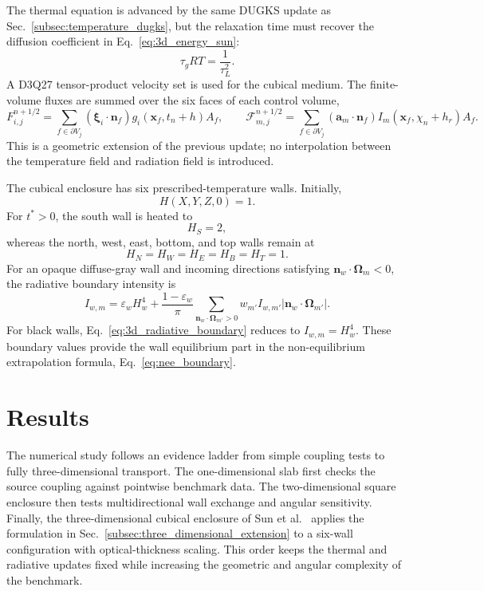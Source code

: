 \documentclass[a4paper,12pt]{ctexart}
\numberwithin{equation}{section}
\newcommand{\vb}[1]{\bm{#1}}
\newcommand{\vx}{\vb{x}}
\newcommand{\vn}{\vb{n}}
\newcommand{\vxi}{\bm{\xi}}
\begin{document}
The thermal equation is advanced by the same DUGKS update as Sec.~\ref{subsec:temperature_dugks}, but the relaxation time must recover the diffusion coefficient in Eq.~\eqref{eq:3d_energy_sun}:
\begin{equation}
\tau_gRT=\frac{1}{\tau_L^2}.
\label{eq:3d_relaxation}
\end{equation}
A D3Q27 tensor-product velocity set is used for the cubical medium. The finite-volume fluxes are summed over the six faces of each control volume,
\begin{equation*}
F_{i,j}^{n+1/2}
=
\sum_{f\in\partial V_j}
(\vxi_i\cdot\vn_f)
 g_i(\vx_f,t_n+h)A_f,
\qquad
\mathcal{F}_{m,j}^{n+1/2}
=
\sum_{f\in\partial V_j}
(\vb{a}_m\cdot\vn_f)
 I_m(\vx_f,\chi_n+h_r)A_f.
\end{equation*}
This is a geometric extension of the previous update; no interpolation between the temperature field and radiation field is introduced.

The cubical enclosure has six prescribed-temperature walls. Initially,
\begin{equation*}
H(X,Y,Z,0)=1.
\end{equation*}
For $t^*>0$, the south wall is heated to
\begin{equation*}
H_S=2,
\end{equation*}
whereas the north, west, east, bottom, and top walls remain at
\begin{equation*}
H_N=H_W=H_E=H_B=H_T=1.
\end{equation*}
For an opaque diffuse-gray wall and incoming directions satisfying $\vn_w\cdot\vb{\Omega}_m<0$, the radiative boundary intensity is
\begin{equation}
I_{w,m}
=
\varepsilon_w H_w^4
+
\frac{1-\varepsilon_w}{\pi}
\sum_{\vn_w\cdot\vb{\Omega}_{m'}>0}
w_{m'}I_{w,m'}\left|\vn_w\cdot\vb{\Omega}_{m'}\right|.
\label{eq:3d_radiative_boundary}
\end{equation}
For black walls, Eq.~\eqref{eq:3d_radiative_boundary} reduces to $I_{w,m}=H_w^4$. These boundary values provide the wall equilibrium part in the non-equilibrium extrapolation formula, Eq.~\eqref{eq:nee_boundary}.

\section{Results}
\label{sec:results}

The numerical study follows an evidence ladder from simple coupling tests to fully three-dimensional transport. The one-dimensional slab first checks the source coupling against pointwise benchmark data. The two-dimensional square enclosure then tests multidirectional wall exchange and angular sensitivity. Finally, the three-dimensional cubical enclosure of Sun et al.~\cite{SunMaLi2012} applies the formulation in Sec.~\ref{subsec:three_dimensional_extension} to a six-wall configuration with optical-thickness scaling. This order keeps the thermal and radiative updates fixed while increasing the geometric and angular complexity of the benchmark.
\end{document}
